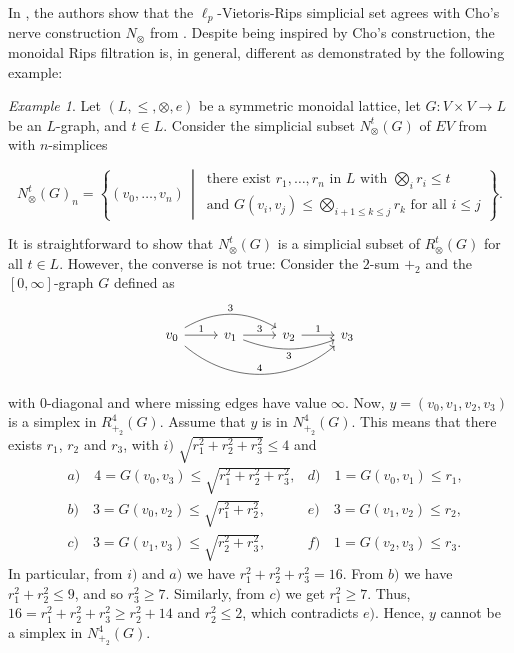 \documentclass[a4paper,11pt]{article}
\newcommand{\tensor}{\otimes}
\newcommand{\bigtensor}{\bigotimes}
\newcounter{dummy}\numberwithin{dummy}{section}
\theoremstyle{remark}
\newtheorem{example}[dummy]{Example}
\begin{document}
In \cite[Proposition~2.6]{ivanov2024ell_p}, the authors show that the $\ell_p$-Vietoris-Rips simplicial set agrees with Cho's nerve construction $N_\tensor$ from \cite{cho}. Despite being inspired by Cho's construction, the monoidal Rips filtration is, in general, different as demonstrated by the following example:
\begin{example}\label{ex:not_cho}
    Let $(L,\leq,\tensor,e)$ be a symmetric monoidal lattice, let $G\colon V\times V\to L$ be an $L$-graph, and $t\in L$. Consider the simplicial subset $N^t_\tensor(G)$ of $EV$ from \cite{cho} with $n$-simplices 

    \begin{equation*}
N^t_\tensor(G)_n=\left\{(v_0,\dots,v_n)\,\middle\vert\,\begin{array}{l}
\text{there exist }r_1,\ldots,r_n\text{ in }L\text{ with }\bigtensor_i r_i\leq t\\
\textrm{and } G(v_i,v_j) \leq \bigtensor_{i+1\leq k\leq j} r_k  \textrm{ for all } i\leq j
\end{array}\right\}.
    \end{equation*}

    It is straightforward to show that $N_\tensor^t(G)$ is a simplicial subset of $R_\tensor^t(G)$ for all $t\in L$. However, the converse is not true:
    Consider the $2$-sum $+_2$ and the $[0,\infty]$-graph $G$ defined as
    \begin{equation*}
        \begin{tikzcd}
            v_0\arrow[r,"1"]\arrow[rr,bend left = 30,"3"]\arrow[rrr,bend right = 40, "4"] & v_1\arrow[r,"3"]\arrow[rr,bend right = 20,swap, "3"] & v_2\arrow[r,"1"] & v_3
        \end{tikzcd}
    \end{equation*}
    with $0$-diagonal and where missing edges have value $\infty$. Now, $y=(v_0,v_1,v_2,v_3)$ is a simplex in $R_{+_2}^4(G)$. Assume that $y$ is in $N_{+_2}^4(G)$. This means that there exists $r_1$, $r_2$ and $r_3$, with $i)$ $\sqrt{r_1^2+r_2^2+r_3^2}\leq 4$ and 
    \begin{align*}
        & a)\quad 4=G(v_0,v_3)\leq \sqrt{r_1^2+r_2^2+r_3^2}, & d) \quad 1=G(v_0,v_1)\leq r_1,\\
        & b)\quad 3=G(v_0,v_2)\leq \sqrt{r_1^2+r_2^2}, & e)\quad 3=G(v_1,v_2)\leq r_2, \\
        & c)\quad 3=G(v_1,v_3)\leq \sqrt{r_2^2+r_3^2}, & f)\quad 1=G(v_2,v_3)\leq r_3.
    \end{align*}
    In particular, from $i)$ and $a)$ we have $r_1^2+r_2^2+r_3^2=16$. From $b)$ we have $r_1^2+r_2^2\leq 9$, and so $r_3^2\geq 7$. Similarly, from $c)$ we get $r_1^2\geq 7$. Thus, $16 = r_1^2+r_2^2+r_3^2\geq r_2^2+14$ and $r^2_2\leq 2$, which contradicts $e)$. Hence, $y$ cannot be a simplex in $N_{+_2}^4(G)$.
\end{example}
\end{document}
